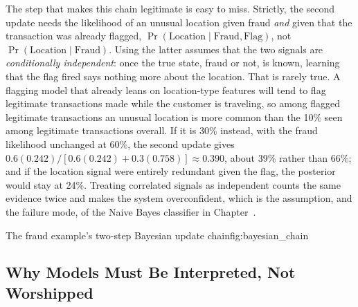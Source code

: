 \documentclass[../ai_in_finance]{subfiles}
\begin{document}
The step that makes this chain legitimate is easy to miss. Strictly, the second update needs the likelihood of an unusual location given fraud \emph{and} given that the transaction was already flagged, $\Pr(\text{Location}\mid\text{Fraud},\text{Flag})$, not $\Pr(\text{Location}\mid\text{Fraud})$. Using the latter assumes that the two signals are \emph{conditionally independent}: once the true state, fraud or not, is known, learning that the flag fired says nothing more about the location. That is rarely true. A flagging model that already leans on location-type features will tend to flag legitimate transactions made while the customer is traveling, so among flagged legitimate transactions an unusual location is more common than the 10\% seen among legitimate transactions overall. If it is 30\% instead, with the fraud likelihood unchanged at 60\%, the second update gives $0.6(0.242)/[0.6(0.242) + 0.3(0.758)] \approx 0.390$, about 39\% rather than 66\%; and if the location signal were entirely redundant given the flag, the posterior would stay at 24\%. Treating correlated signals as independent counts the same evidence twice and makes the system overconfident, which is the assumption, and the failure mode, of the Naive Bayes classifier in Chapter~.

\begin{bookfigure}[htbp]{The fraud example's two-step Bayesian update chain}{fig:bayesian_chain}
\end{bookfigure}

\subsection{Why Models Must Be Interpreted, Not Worshipped}
\end{document}
